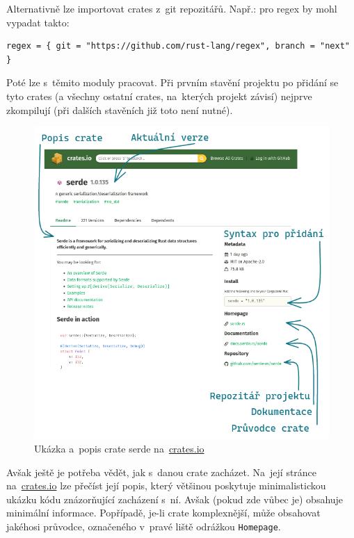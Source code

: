 \documentclass[a4paper, 12pt, twoside]{article} %
\begin{document}
			Alternativně lze importovat crates z~git repozitářů. Např.: pro regex by mohl vypadat takto:
			\begin{verbatim}
regex = { git = "https://github.com/rust-lang/regex", branch = "next" }
			\end{verbatim}

			Poté lze s~těmito moduly pracovat. Při prvním stavění projektu po přidání se tyto crates (a všechny ostatní crates, na~kterých projekt závisí) nejprve zkompilují (při dalších stavěních již toto není nutné).
			\begin{center}
				\begin{figure}[H]
					\centering
					\includegraphics[width=0.95\linewidth]{cratesio}
					\caption{Ukázka a~popis crate serde na~\href{https://crates.io}{crates.io}}
					\label{fig:cratesio}
				\end{figure}
			\end{center}
			
			Avšak ještě je potřeba vědět, jak s~danou crate zacházet. Na~její stránce na~\href{https://crates.io}{crates.io} lze přečíst její popis, který většinou poskytuje minimalistickou ukázku kódu znázorňující zacházení s~ní. Avšak (pokud zde vůbec je) obsahuje minimální informace. Popřípadě, je-li crate komplexnější, může obsahovat jakéhosi průvodce, označeného v~pravé liště odrážkou \texttt{Homepage}.
\end{document}
